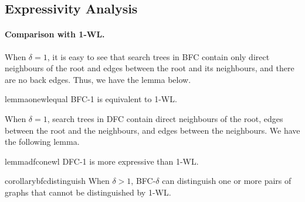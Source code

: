 
\subsection{Expressivity Analysis}

\paragraph{Comparison with 1-WL.}
When $\delta=1$, it is easy to see that search trees in BFC contain only direct neighbours of the root and edges between the root and its neighbours, and there are no back edges. Thus, we have the lemma below.
\begin{restatable}[]{lemma}{onewlequal}
\label{lemma:1wlequal}
BFC-1 is equivalent to 1-WL.
\end{restatable}

When $\delta=1$, search trees in DFC contain direct neighbours of the root, edges between the root and the neighbours, and edges between the neighbours. We have the following lemma.
\begin{restatable}[]{lemma}{dfconewl}
\label{lemma:dfc1wl}
DFC-1 is more expressive than 1-WL.
\end{restatable}


\begin{restatable}[]{corollary}{bfcdistinguish}
\label{lemma:bfc_distinguish}
When $\delta > 1$, BFC-$\delta$ can distinguish one or more pairs of graphs that cannot be distinguished by 1-WL.
\end{restatable}

